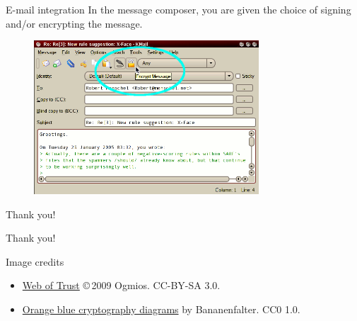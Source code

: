 \documentclass[%
mode=present,%
paper=smartboard,
size=20pt,
]{powerdot}
\begin{document}
\begin{slide}[toc=]{E-mail integration}
  In the message composer, you are given the choice of signing and/or
  encrypting the message.
  \begin{figure}[H]
    \centering
    \includegraphics[width=0.75\textwidth]{kmail_send}
    \label{fig:kmail_send}
  \end{figure}
\end{slide}

\begin{slide}[toc=]{Thank you!}
\centering

\vfill

Thank you!

\vfill
\end{slide}

\begin{slide}[toc=]{Image credits}

  \begin{itemize}
  \item \href{https://commons.wikimedia.org/wiki/File:Web_of_Trust.svg}{Web of Trust} \copyright\,2009 Ogmios. CC-BY-SA 3.0.
  \item \href{https://commons.wikimedia.org/wiki/Category:Orange_blue_cryptography_diagrams}{Orange blue cryptography diagrams} by Bananenfalter. CC0 1.0.
  \end{itemize}

\end{slide}
\end{document}
